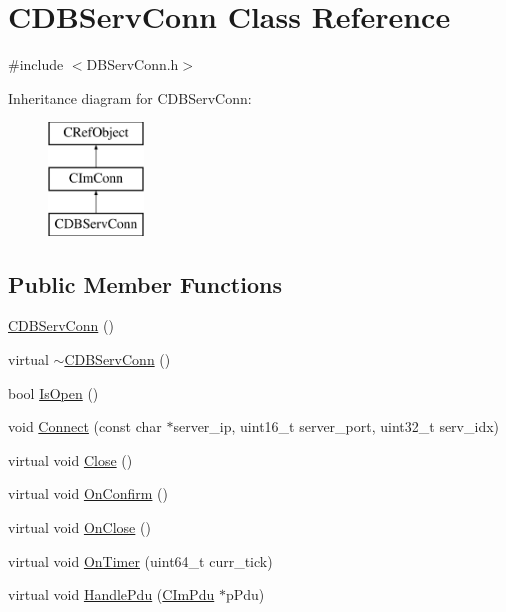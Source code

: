 \hypertarget{class_c_d_b_serv_conn}{}\section{C\+D\+B\+Serv\+Conn Class Reference}
\label{class_c_d_b_serv_conn}


{\ttfamily \#include $<$D\+B\+Serv\+Conn.\+h$>$}

Inheritance diagram for C\+D\+B\+Serv\+Conn\+:\begin{figure}[H]
\begin{center}
\leavevmode
\includegraphics[height=3.000000cm]{class_c_d_b_serv_conn}
\end{center}
\end{figure}
\subsection*{Public Member Functions}
\begin{DoxyCompactItemize}
\item 
\hyperlink{class_c_d_b_serv_conn_ac4f4cd0156da70cb100cfeb8c2bc65a3}{C\+D\+B\+Serv\+Conn} ()
\item 
virtual \hyperlink{class_c_d_b_serv_conn_a609bbf96d4eeadb355fa5bc03648f60c}{$\sim$\+C\+D\+B\+Serv\+Conn} ()
\item 
bool \hyperlink{class_c_d_b_serv_conn_a8ecc4e396ff581c5c999368dbbfa4274}{Is\+Open} ()
\item 
void \hyperlink{class_c_d_b_serv_conn_a2f76c0979a0704d2b70d1ecb36a04153}{Connect} (const char $\ast$server\+\_\+ip, uint16\+\_\+t server\+\_\+port, uint32\+\_\+t serv\+\_\+idx)
\item 
virtual void \hyperlink{class_c_d_b_serv_conn_af46c8af21e54165f72773bedc43747c5}{Close} ()
\item 
virtual void \hyperlink{class_c_d_b_serv_conn_a505a4864a834dea98261426add53c53d}{On\+Confirm} ()
\item 
virtual void \hyperlink{class_c_d_b_serv_conn_a9306898f792792b625fc7bf00aca75b1}{On\+Close} ()
\item 
virtual void \hyperlink{class_c_d_b_serv_conn_a01abb76d31f58b0db817676081150c1c}{On\+Timer} (uint64\+\_\+t curr\+\_\+tick)
\item 
virtual void \hyperlink{class_c_d_b_serv_conn_a18efec1c8bf95440f57bc415e71eb9a7}{Handle\+Pdu} (\hyperlink{class_c_im_pdu}{C\+Im\+Pdu} $\ast$p\+Pdu)
\end{DoxyCompactItemize}
